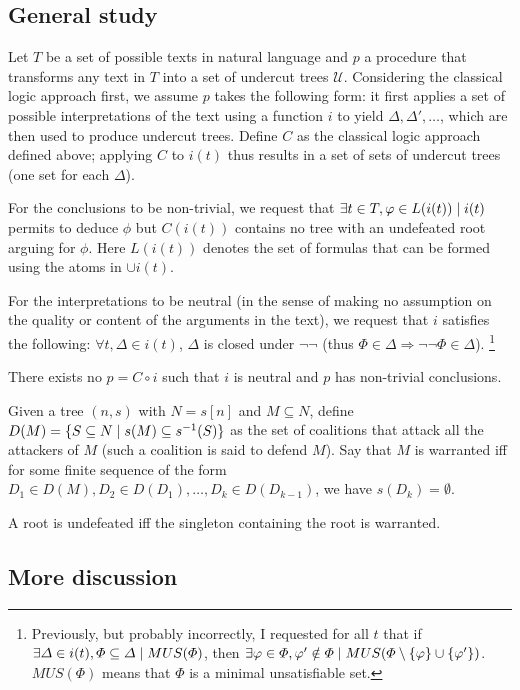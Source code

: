 \documentclass[version=3.21, pagesize, twoside=off, bibliography=totoc, DIV=calc, fontsize=12pt, a4paper, french, english]{scrartcl}
\begin{document}
\subsection{General study}
Let $T$ be a set of possible texts in natural language and $p$ a procedure that transforms any text in $T$ into a set of undercut trees $\mathcal{U}$. Considering the classical logic approach first, we assume $p$ takes the following form: it first applies a set of possible interpretations of the text using a function $i$ to yield $\Delta, \Delta', …$, which are then used to produce undercut trees. Define $C$ as the classical logic approach defined above; applying $C$ to $i(t)$ thus results in a set of sets of undercut trees (one set for each $\Delta$).

For the conclusions to be non-trivial, we request that $\exists t \in T, \phi \in L(i(t)) \suchthat i(t) $ permits to deduce $\phi$ but $C(i(t))$ contains no tree with an undefeated root arguing for $\phi$. Here $L(i(t))$ denotes the set of formulas that can be formed using the atoms in $\cup i(t)$.

For the interpretations to be neutral (in the sense of making no assumption on the quality or content of the arguments in the text), we request that $i$ satisfies the following: $\forall t, \Delta \in i(t)$, $\Delta$ is closed under $¬¬$ (thus $\Phi \in \Delta ⇒ ¬¬\Phi \in \Delta$).
\footnote{Previously, but probably incorrectly, I requested for all $t$ that if $\exists \Delta \in i(t), \Phi \subseteq \Delta \suchthat MUS(\Phi)$, then $\exists \phi \in \Phi, \phi' \notin \Phi \suchthat MUS(\Phi \setminus \set{\phi} \cup \set{\phi'})$. $MUS(\Phi)$ means that $\Phi$ is a minimal unsatisfiable set.}

\begin{theorem}
	There exists no $p = C \circ i$ such that $i$ is neutral and $p$ has non-trivial conclusions.
\end{theorem}
Given a tree $(n, s)$ with $N = s[n]$ and $M \subseteq N$, define $D(M) = \set{S \subseteq N \suchthat s(M) \subseteq s^{-1}(S)}$ as the set of coalitions that attack all the attackers of $M$ (such a coalition is said to defend $M$). Say that $M$ is warranted iff for some finite sequence of the form $D_1 \in D(M), D_2 \in D(D_1), …, D_k \in D(D_{k - 1})$, we have $s(D_k) = \emptyset$.
\begin{lemma}
	A root is undefeated iff the singleton containing the root is warranted.
\end{lemma}

\subsection{More discussion}
\end{document}
